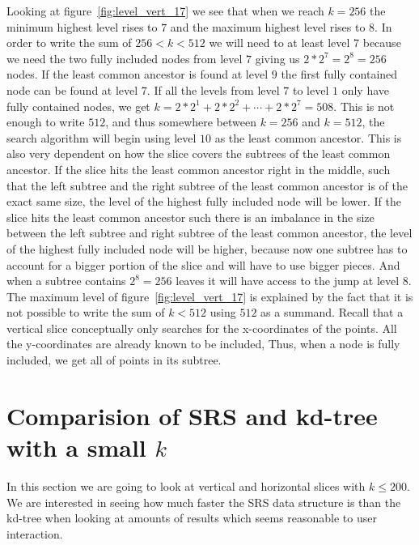 Looking at figure~\ref{fig:level_vert_17} we see that when we reach $k=256$ the minimum highest level rises to $7$ and the maximum highest level rises to $8$. In order to write the sum of $256<k<512$ we will need to at least level $7$ because we need the two fully included nodes from level $7$ giving us $2*2^7 = 2^8 = 256$ nodes. If the least common ancestor is found at level $9$ the first fully contained node can be found at level $7$. If all the levels from level $7$ to level $1$ only have fully contained nodes, we get $k = 2*2^1 + 2*2^2 + \cdots + 2*2^7 = 508$. This is not enough to write $512$, and thus somewhere between $k=256$ and $k=512$, the search algorithm will begin using level $10$ as the least common ancestor. This is also very dependent on how the slice covers the subtrees of the least common ancestor. If the slice hits the least common ancestor right in the middle, such that the left subtree and the right subtree of the least common ancestor is of the exact same size, the level of the highest fully included node will be lower. If the slice hits the least common ancestor such there is an imbalance in the size between the left subtree and right subtree of the least common ancestor, the level of the highest fully included node will be higher, because now one subtree has to account for a bigger portion of the slice and will have to use bigger pieces. And when a subtree contains $2^8 = 256$ leaves it will have access to the jump at level $8$. The maximum level of figure~\ref{fig:level_vert_17} is explained by the fact that it is not possible to write the sum of $k<512$ using $512$ as a summand. Recall that a vertical slice conceptually only searches for the x-coordinates of the points. All the y-coordinates are already known to be included, Thus, when a node is fully included, we get all of points in its subtree.   





\section{Comparision of SRS and kd-tree with a small $k$}
\label{sect:smallk}


In this section we are going to look at vertical and horizontal slices with $k\leq 200$. We are interested in seeing how much faster the SRS data structure is than the kd-tree when looking at amounts of results which seems reasonable to user interaction.

